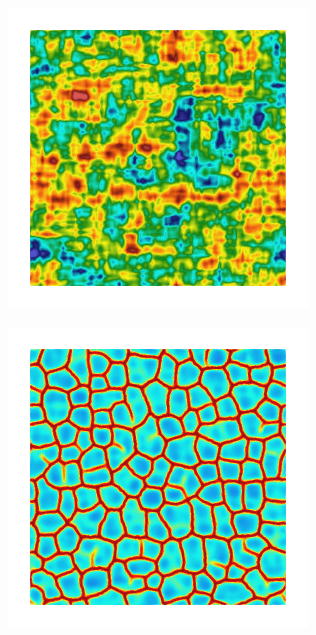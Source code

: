 \begin{figure}[!htb]
\begin{subfigure}[b]{0.15\textwidth}
    \end{subfigure}
    \begin{subfigure}[b]{0.15\textwidth}
        \includegraphics[width=\textwidth]{past/figures/psic_exp_cartesian_5_5_rho_0_seed_b.png}
    \end{subfigure}
    \begin{subfigure}[b]{0.15\textwidth}
        \includegraphics[width=\textwidth]{past/figures/d_exp_cartesian_5_5_rho_0_seed_b.png}
    \end{subfigure}


\end{figure}
